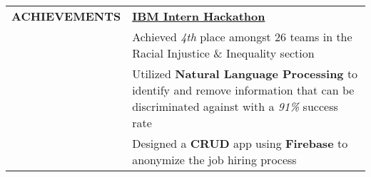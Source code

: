 \documentclass[letterpaper,11pt,oneside]{article}
\newcommand\tabitem{\makebox[1em][r]{-~~}} %
\newcommand\tabspace{\makebox[1em][r]{~~~}} %
\begin{document}
\begin{tabular}{@{}p{1.15in} p{6.08in}@{}}
 \textbf{ACHIEVEMENTS}
     & \textbf{\href{https://www.ibm.com/blogs/jobs/2020/08/19/winning-projects-of-the-ibm-north-america-intern-hackathon/}{IBM Intern Hackathon}} \\
     & \tabitem Achieved \textit{4th} place amongst 26 teams in the Racial Injustice \& Inequality section \\
     & \tabitem Utilized \textbf{Natural Language Processing} to identify and remove information that can be \tabspace discriminated against with a \textit{91\%} success rate \\
     & \tabitem Designed a \textbf{CRUD} app using \textbf{Firebase} to anonymize the job hiring process \\

\end{tabular}
\end{document}
